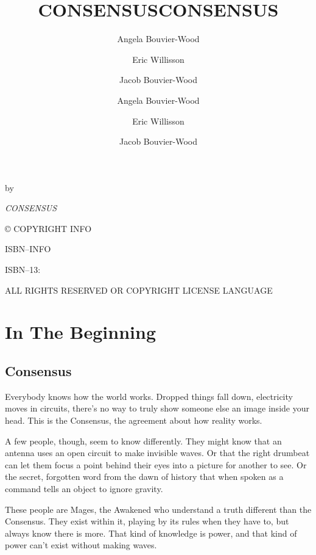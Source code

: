 \documentclass[
]{memoir}
\title{CONSENSUS}
\author{Angela Bouvier-Wood \and Eric Willisson \and Jacob Bouvier-Wood}
\date{} %
\author{Angela Bouvier-Wood \and Eric Willisson \and Jacob Bouvier-Wood}
\title{CONSENSUS}
\date{}
\makeatletter
\def\maketitle{%
  \null
  \thispagestyle{empty}%
  \vfill
  \begin{center}\leavevmode
    \chapterfont
    {\HUGE\center \@title\par}%
\vskip 5cm
    \normalfont
    {\normalsize\center by}\par
    {\large\center \@author\par}%
    \vskip 1cm
  \end{center}%
  \vfill
  \null
  \cleardoublepage
  }
\makeatother
\begin{document}
\let\cleardoublepage\clearpage


\maketitle






\frontmatter

\null\vfill

\begin{flushleft}
\textit{CONSENSUS}


© COPYRIGHT INFO


ISBN--INFO

ISBN--13: 
\bigskip





ALL RIGHTS RESERVED OR COPYRIGHT LICENSE LANGUAGE




\end{flushleft}
\let\cleardoublepage\clearpage

\mainmatter
\pagestyle{ruled}

{
\tableofcontents
}



\hypertarget{in-the-beginning}{%
\chapter{In The Beginning}\label{in-the-beginning}}

\hypertarget{consensus}{%
\section{Consensus}\label{consensus}}

Everybody knows how the world works. Dropped things fall down,
electricity moves in circuits, there's no way to truly show someone else
an image inside your head. This is the Consensus, the agreement about
how reality works.

A few people, though, seem to know differently. They might know that an
antenna uses an open circuit to make invisible waves. Or that the right
drumbeat can let them focus a point behind their eyes into a picture for
another to see. Or the secret, forgotten word from the dawn of history
that when spoken as a command tells an object to ignore gravity.

These people are Mages, the Awakened who understand a truth different
than the Consensus. They exist within it, playing by its rules when they
have to, but always know there is more. That kind of knowledge is power,
and that kind of power can't exist without making waves.
\end{document}
